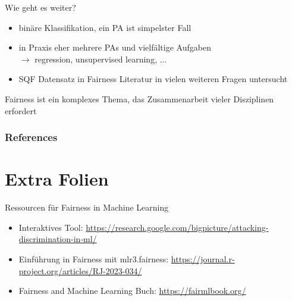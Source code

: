 \documentclass[aspectratio=169]{beamer}
\begin{document}
\begin{frame}{Wie geht es weiter?}
	\begin{itemize}
		\item binäre Klassifikation, ein PA ist simpelster Fall
		\item in Praxis eher mehrere PAs und vielfältige Aufgaben\\ $\rightarrow$ regression, unsupervised learning, ...
		\item SQF Datensatz in Fairness Literatur in vielen weiteren Fragen untersucht
	\end{itemize}
	\vspace*{1cm}
	 Fairness ist ein komplexes Thema, das Zusammenarbeit vieler Disziplinen erfordert
\end{frame}

\begin{frame}[allowframebreaks]
	\frametitle{References}
	
	
\end{frame}

\section{Extra Folien}

\begin{frame}{Ressourcen für Fairness in Machine Learning}
    \begin{itemize}
        \item Interaktives Tool: \url{https://research.google.com/bigpicture/attacking-discrimination-in-ml/}
        \item Einführung in Fairness mit mlr3.fairness: \url{https://journal.r-project.org/articles/RJ-2023-034/}
        \item Fairness and Machine Learning Buch: \url{https://fairmlbook.org/}
    \end{itemize}
\end{frame}
\end{document}
